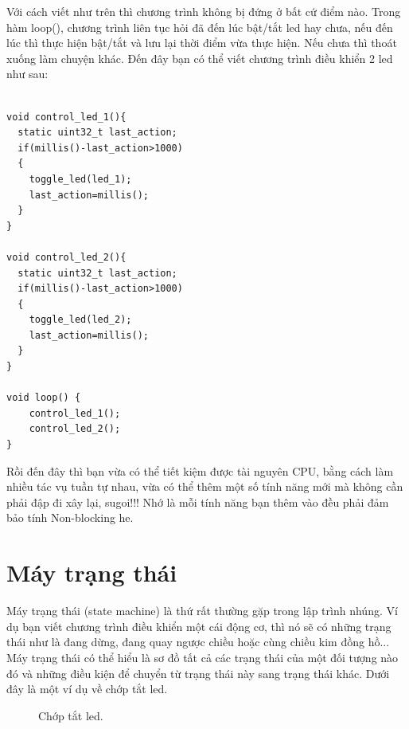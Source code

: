 Với cách viết như trên thì chương trình không bị đứng ở bất cứ điểm nào. Trong hàm loop(), chương trình liên tục hỏi đã đến lúc bật/tắt led hay chưa, nếu đến lúc thì thực hiện bật/tắt và lưu lại thời điểm vừa thực hiện. Nếu chưa thì thoát xuống làm chuyện khác. Đến đây bạn có thể viết chương trình điều khiển 2 led như sau:

\begin{lstlisting}

void control_led_1(){
  static uint32_t last_action;
  if(millis()-last_action>1000)
  {
    toggle_led(led_1);
    last_action=millis();
  }	
}

void control_led_2(){
  static uint32_t last_action;
  if(millis()-last_action>1000)
  {
    toggle_led(led_2);
    last_action=millis();
  }	
}

void loop() {
	control_led_1();
	control_led_2();
}
\end{lstlisting}

Rồi đến đây thì bạn vừa có thể tiết kiệm được tài nguyên CPU, bằng cách làm nhiều tác vụ tuần tự nhau, vừa có thể thêm một số tính năng mới mà không cần phải đập đi xây lại, sugoi!!! Nhớ là mỗi tính năng bạn thêm vào đều phải đảm bảo tính Non-blocking he.
\section{Máy trạng thái}

Máy trạng thái (state machine) là thứ rất thường gặp trong lập trình nhúng. Ví dụ bạn viết chương trình điều khiển một cái động cơ, thì nó sẽ có những trạng thái như là đang dừng, đang quay ngược chiều hoặc cùng chiều kim đồng hồ... Máy trạng thái có thể hiểu là sơ đồ tất cả các trạng thái của một đối tượng nào đó và những điều kiện để chuyển từ trạng thái này sang trạng thái khác. Dưới đây là một ví dụ về chớp tắt led.
\begin{figure}[h!]
	\centering
{}
\caption{Chớp tắt led.}
\end{figure}

